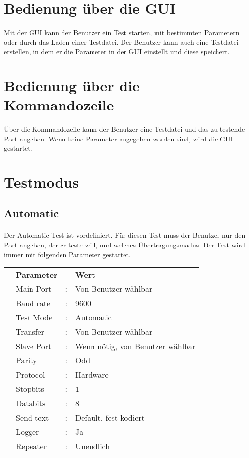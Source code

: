 \section{Bedienung über die GUI}
\paragraph{}
Mit der GUI kann der Benutzer ein Test starten, mit bestimmten Parametern oder durch das Laden einer Testdatei. Der Benutzer kann auch eine Testdatei erstellen, in dem er die Parameter in der GUI einstellt und diese speichert.

\section{Bedienung über die Kommandozeile}
\paragraph{}
Über die Kommandozeile kann der Benutzer eine Testdatei und das zu testende Port angeben. Wenn keine Parameter angegeben worden sind, wird die GUI gestartet.

\section{Testmodus}

\subsection{Automatic}
\paragraph{}
Der Automatic Test ist vordefiniert. Für diesen Test muss der Benutzer nur den Port angeben, der er teste will, und welches Übertragungsmodus. Der Test wird immer mit folgenden Parameter gestartet.
\\
\begin{tabular}{llll}
\\ &\textbf{Parameter} & &\textbf{Wert}
\\ &Main Port &: &Von Benutzer wählbar
\\ &Baud rate &: &9600
\\ &Test Mode &: &Automatic
\\ &Transfer &: &Von Benutzer wählbar
\\ &Slave Port &: &Wenn nötig, von Benutzer wählbar
\\ &Parity &: &Odd
\\ &Protocol &: &Hardware
\\ &Stopbits &: &1
\\ &Databits &: &8
\\ &Send text &: &Default, fest kodiert
\\ &Logger &: &Ja
\\ &Repeater &: &Unendlich
\end{tabular}


